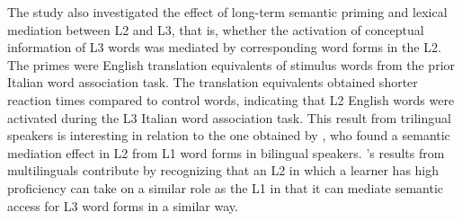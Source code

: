 \documentclass[output=paper,colorlinks,citecolor=brown,nonflat]{langsci/langscibook}
\begin{document}
The study also investigated the effect of long-term semantic priming and lexical mediation between L2 and L3, that is, whether the activation of conceptual information of L3 words was mediated by corresponding word forms in the L2. The primes were English translation equivalents of stimulus words from the prior Italian word association task. The translation equivalents obtained shorter reaction times compared to control words, indicating that L2 English words were activated during the L3 Italian word association task. This result from trilingual speakers is interesting in relation to the one obtained by \citet{FitzpatrickIzura2011}, who found a semantic mediation effect in L2 from L1 word forms in bilingual speakers. \citeauthor{chapters/gudmundson}’s results from multilinguals contribute by recognizing that an L2 in which a learner has high proficiency can take on a similar role as the L1 in that it can mediate semantic access for L3 word forms in a similar way.
\end{document}
